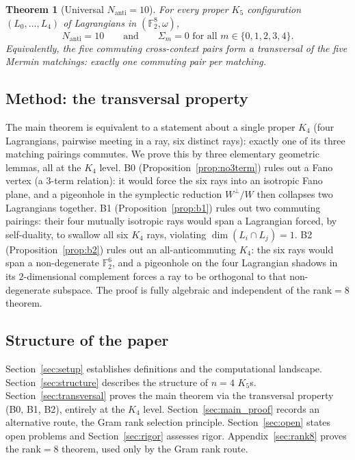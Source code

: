 \documentclass[11pt,a4paper]{article}
\newtheorem{theorem}{Theorem}[section]
\theoremstyle{remark}
\begin{document}
\begin{theorem}[Universal $N_{\mathrm{anti}} = 10$]\label{thm:main}
For every proper $K_5$ configuration $(L_0, \ldots, L_4)$ of Lagrangians
in $(\mathbb{F}_2^8, \omega)$,
\[
  N_{\mathrm{anti}} = 10
  \qquad \text{and} \qquad
  \Sigma_m = 0 \text{ for all } m \in \{0,1,2,3,4\}.
\]
Equivalently, the five commuting cross-context pairs form a
\emph{transversal} of the five Mermin matchings: exactly one commuting
pair per matching.
\end{theorem}

\subsection*{Method: the transversal property}

The main theorem is equivalent to a statement about a single proper $K_4$ (four
Lagrangians, pairwise meeting in a ray, six distinct rays): exactly one of its
three matching pairings commutes. We prove this by three elementary geometric
lemmas, all at the $K_4$ level. B0 (Proposition~\ref{prop:no3term}) rules out a
Fano vertex (a 3-term relation): it would force the six rays into an isotropic Fano
plane, and a pigeonhole in the symplectic reduction $W^\perp/W$ then collapses two
Lagrangians together. B1 (Proposition~\ref{prop:b1}) rules out two commuting
pairings: their four mutually isotropic rays would span a Lagrangian forced, by
self-duality, to swallow all six $K_4$ rays, violating $\dim(L_i\cap L_j)=1$. B2
(Proposition~\ref{prop:b2}) rules out an all-anticommuting $K_4$: the six rays would
span a non-degenerate $\mathbb{F}_2^6$, and a pigeonhole on the four Lagrangian
shadows in its $2$-dimensional complement forces a ray to be orthogonal to that
non-degenerate subspace. The proof is fully algebraic and independent of the
rank$=8$ theorem.

\subsection*{Structure of the paper}

Section~\ref{sec:setup} establishes definitions and the computational landscape.
Section~\ref{sec:structure} describes the structure of $n=4$ $K_5$s.
Section~\ref{sec:transversal} proves the main theorem via the transversal property
(B0, B1, B2), entirely at the $K_4$ level.
Section~\ref{sec:main_proof} records an alternative route, the Gram rank selection
principle.
Section~\ref{sec:open} states open problems and Section~\ref{sec:rigor} assesses
rigor. Appendix~\ref{sec:rank8} proves the rank$=8$ theorem, used only by the
Gram rank route.
\end{document}
